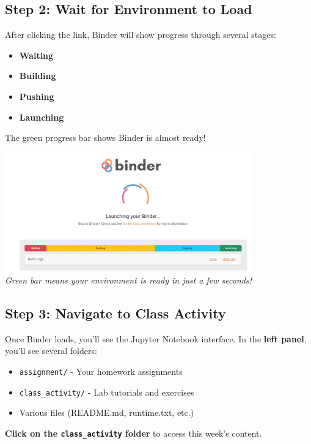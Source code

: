 \documentclass[11pt,a4paper]{article}
\begin{document}
\subsection{Step 2: Wait for Environment to Load}

After clicking the link, Binder will show progress through several stages:
\begin{itemize}
    \item \textbf{Waiting}
    \item \textbf{Building}
    \item \textbf{Pushing}
    \item \textbf{Launching}
\end{itemize}

The green progress bar shows Binder is almost ready!

\begin{center}
\includegraphics[width=0.8\textwidth]{../Image_2.png}\\
\textit{Green bar means your environment is ready in just a few seconds!}
\end{center}

\subsection{Step 3: Navigate to Class Activity}

Once Binder loads, you'll see the Jupyter Notebook interface. In the \textbf{left panel}, you'll see several folders:
\begin{itemize}
    \item \texttt{assignment/} - Your homework assignments
    \item \texttt{class\_activity/} - Lab tutorials and exercises
    \item Various files (README.md, runtime.txt, etc.)
\end{itemize}

\textbf{Click on the \texttt{class\_activity} folder} to access this week's content.
\end{document}
